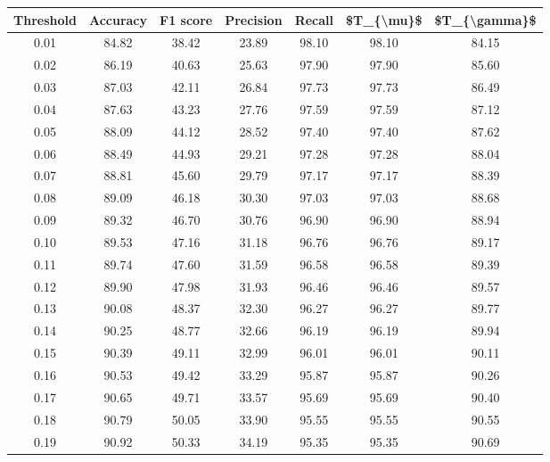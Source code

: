 \begin{tabular}{|c|c|c|c|c|c|c|}
\hline
 Threshold &  Accuracy &  F1 score &  Precision &  Recall &  \$T\_\{\textbackslash mu\}\$ &  \$T\_\{\textbackslash gamma\}\$ \\
\hline
      0.01 &     84.82 &     38.42 &      23.89 &   98.10 &      98.10 &         84.15 \\
      0.02 &     86.19 &     40.63 &      25.63 &   97.90 &      97.90 &         85.60 \\
      0.03 &     87.03 &     42.11 &      26.84 &   97.73 &      97.73 &         86.49 \\
      0.04 &     87.63 &     43.23 &      27.76 &   97.59 &      97.59 &         87.12 \\
      0.05 &     88.09 &     44.12 &      28.52 &   97.40 &      97.40 &         87.62 \\
      0.06 &     88.49 &     44.93 &      29.21 &   97.28 &      97.28 &         88.04 \\
      0.07 &     88.81 &     45.60 &      29.79 &   97.17 &      97.17 &         88.39 \\
      0.08 &     89.09 &     46.18 &      30.30 &   97.03 &      97.03 &         88.68 \\
      0.09 &     89.32 &     46.70 &      30.76 &   96.90 &      96.90 &         88.94 \\
      0.10 &     89.53 &     47.16 &      31.18 &   96.76 &      96.76 &         89.17 \\
      0.11 &     89.74 &     47.60 &      31.59 &   96.58 &      96.58 &         89.39 \\
      0.12 &     89.90 &     47.98 &      31.93 &   96.46 &      96.46 &         89.57 \\
      0.13 &     90.08 &     48.37 &      32.30 &   96.27 &      96.27 &         89.77 \\
      0.14 &     90.25 &     48.77 &      32.66 &   96.19 &      96.19 &         89.94 \\
      0.15 &     90.39 &     49.11 &      32.99 &   96.01 &      96.01 &         90.11 \\
      0.16 &     90.53 &     49.42 &      33.29 &   95.87 &      95.87 &         90.26 \\
      0.17 &     90.65 &     49.71 &      33.57 &   95.69 &      95.69 &         90.40 \\
      0.18 &     90.79 &     50.05 &      33.90 &   95.55 &      95.55 &         90.55 \\
      0.19 &     90.92 &     50.33 &      34.19 &   95.35 &      95.35 &         90.69 \\

\end{tabular}
